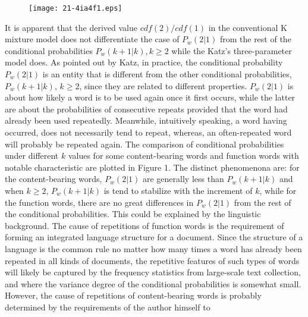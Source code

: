 \documentclass[english]{jnlp_1.4_rep}
\begin{document}
\begin{figure}[p]
\begin{center}
\texttt{[image: 21-4ia4f1.eps]}
\end{center}
\end{figure}
It is apparent that the derived value $\mathit{cdf}(2) / \mathit{cdf}(1)$ in the conventional K mixture model does not differentiate the case of
$P_{w}(2|1)$ from the rest of the conditional probabilities $P_{w}(k+1|k),k\geq 2$ while the Katz's three-parameter model does. As pointed out by
Katz, in practice, the conditional probability $P_{w}(2|1)$ is an entity that is different from the other conditional probabilities, 
\linebreak
$P_{w}(k+1|k)$,
$k\geq 2$, since they are related to different properties. $P_{w}(2|1)$ is about how likely a word is to be used again once it first occurs, while
the latter are about the probabilities of consecutive repeats provided that the word had already been used repeatedly. Meanwhile, intuitively
speaking, a word having occurred, does not necessarily tend to repeat, whereas, an often-repeated word will probably be repeated again. The
comparison of conditional probabilities under different $k$ values for some content-bearing words and function words with notable characteristic are
plotted in Figure 1. The distinct phenomenona are: for the content-bearing words, $P_{w}(2 \vert 1)$ are generally less than $P_{w}(k+1 \vert k)$
and when $k \geq 2$, $P_{w}(k+1 \vert k)$ is tend to stabilize with the increment of $k$, while for the function words, there are no great
differences in $P_{w}(2 \vert 1)$ from the rest of the conditional probabilities. This could be explained by the linguistic background. The cause of
repetitions of function words is the requirement of forming an integrated language structure for a document. Since the structure of a language is
the common rule no matter how many times a word has already been repeated in all kinds of documents, the repetitive features of such types of words
will likely be captured by the frequency statistics from large-scale text collection, and where the variance degree of the conditional probabilities
is somewhat small. However, the cause of repetitions of content-bearing words is probably determined by the requirements of the author himself to
\end{document}
